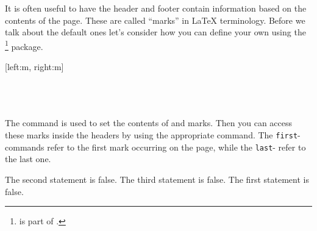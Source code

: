 It is often useful to have the header and footer contain information based on
the contents of the page. These are called \enquote{marks} in \LaTeX{}
terminology. Before we talk about the default ones let's consider how you can
define your own using the \footnote{ is part
  of .} package.
\begin{lscommand}
  [left:m, right:m] \\
   \\
   \\
   \\
\end{lscommand}
The  command is used to set the contents of  and 
marks. Then you can access these marks inside the headers by using the appropriate
command. The \texttt{first}- commands refer to the first mark occurring on the
page, while the \texttt{last}- refer to the last one.
\begin{example}[standalone, paperheight=4cm]
\geometry{includehead, includefoot, headsep=.5em, footskip=1em} %
\sloppy %
\usepackage{fancyhdr}%
\usepackage{extramarks}
\pagestyle{fancy}%

\fancyhead[L]{\firstleftxmark}
\fancyhead[R]{\lastleftxmark}
\fancyfoot[L]{\firstrightxmark}
\fancyfoot[R]{\lastrightxmark}

\noindent %
The second statement is false.
The third statement is false.
The first statement is false.
\end{example}

